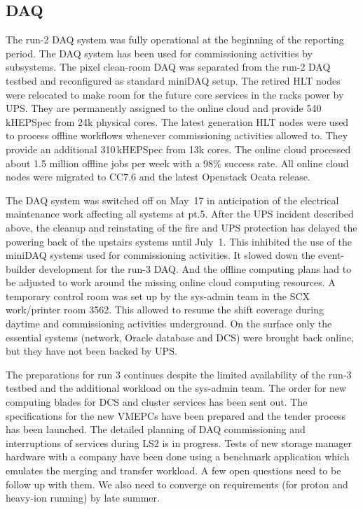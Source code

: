 \documentclass[12pt]{article}
\begin{document}
\subsection{DAQ}
The run-2 DAQ system was fully operational at the beginning of the reporting period.
The DAQ system has been used for commissioning activities by subsystems.
The pixel clean-room DAQ was separated from the run-2 DAQ testbed and reconfigured as standard miniDAQ setup.
The retired HLT nodes were relocated to make room for the future core services in the racks power by UPS. They are permanently assigned to the online cloud and provide 540\,kHEPSpec from 24k physical cores. 
The latest generation HLT nodes were used to process offline workflows whenever commissioning activities allowed to. They provide an additional 310\,kHEPSpec from 13k cores. The online cloud processed about 1.5 million offline jobs per week with a 98\% success rate.
All online cloud nodes were migrated to CC7.6 and the latest Openstack Ocata release.

The DAQ system was switched off on May~17 in anticipation of the electrical maintenance work affecting all systems at pt.5. After the UPS incident described above,  the cleanup and reinstating of the fire and UPS protection has delayed the powering back of the upstairs systems until July~1.
This inhibited the use of the miniDAQ systems used for commissioning activities. It slowed down the event-builder development for the run-3 DAQ. And the offline computing plans had to be adjusted to work around the missing online cloud computing resources. 
A temporary control room was set up by the sys-admin team in the SCX work/printer room 3562. This allowed to resume the shift coverage during daytime and commissioning activities underground.
On the surface only the essential systems (network, Oracle database and DCS) were brought back online, but they have not been backed by UPS.

The preparations for run 3 continues despite the limited availability of the run-3 testbed and the additional workload on the sys-admin team.
The order for new computing blades for DCS and cluster services has been sent out.
The specifications for the new VMEPCs have been prepared and the tender process has been launched.
The detailed planning of DAQ commissioning and interruptions of services during LS2 is in progress.
Tests of new storage manager hardware with a company have been done using a benchmark application which emulates the merging and transfer workload. A few open questions need to be follow up with them. We also need to converge on requirements (for proton and heavy-ion running) by late summer.
\end{document}
